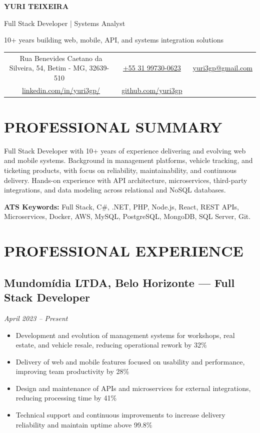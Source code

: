 \documentclass[11pt,a4paper]{article}
\newcommand{\experiencia}[4]{
    \subsection{#1, #2 — #3}
    \textit{#4}
    \vspace{4pt}
}
\begin{document}
\begin{center}
    {\huge\bfseries\color{darkblue} YURI TEIXEIRA}
    \vspace{8pt}
    
    {\large Full Stack Developer | Systems Analyst}
    \vspace{4pt}
    
    {\color{darkgray} 10+ years building web, mobile, API, and systems integration solutions}
    \vspace{12pt}
    
    \begin{tabular}{c c c}
        \ Rua Benevides Caetano da Silveira, 54, Betim - MG, 32639-510 & 
        \ \href{https://wa.me/5531997300623}{+55 31 99730-0623} & 
        \ \href{mailto:yuri3gp@gmail.com}{yuri3gp@gmail.com} \\
        \ \href{https://www.linkedin.com/in/yuri3gp/}{linkedin.com/in/yuri3gp/} & 
        \ \href{https://github.com/yuri3gp}{github.com/yuri3gp}
    \end{tabular}
\end{center}

\section{PROFESSIONAL SUMMARY}

Full Stack Developer with 10+ years of experience delivering and evolving web and mobile systems.
Background in management platforms, vehicle tracking, and ticketing products, with focus on reliability, maintainability, and continuous delivery.
Hands-on experience with API architecture, microservices, third-party integrations, and data modeling across relational and NoSQL databases.

\vspace{6pt}
\textbf{ATS Keywords:} Full Stack, C\#, .NET, PHP, Node.js, React, REST APIs, Microservices, Docker, AWS, MySQL, PostgreSQL, MongoDB, SQL Server, Git.

\vspace{20pt}

\section{PROFESSIONAL EXPERIENCE}

\experiencia{Mundomídia LTDA}{Belo Horizonte}{Full Stack Developer}{April 2023 – Present}
\begin{itemize}[leftmargin=20pt, topsep=0pt, itemsep=2pt]
    \item Development and evolution of management systems for workshops, real estate, and vehicle resale, reducing operational rework by 32\%
    \item Delivery of web and mobile features focused on usability and performance, improving team productivity by 28\%
    \item Design and maintenance of APIs and microservices for external integrations, reducing processing time by 41\%
    \item Technical support and continuous improvements to increase delivery reliability and maintain uptime above 99.8\%
\end{itemize}
\end{document}
